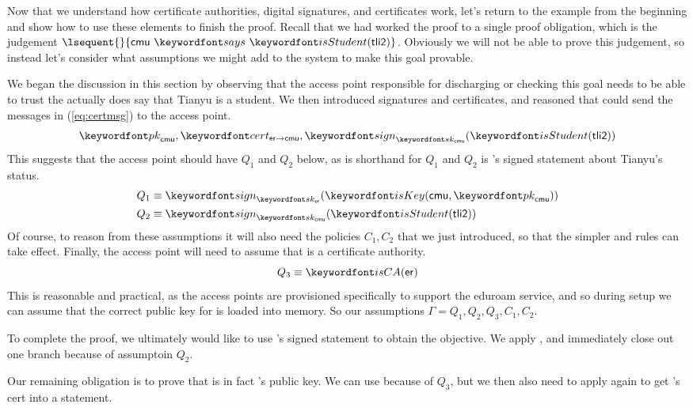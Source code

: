 \documentclass[11pt,twoside]{scrartcl}
\begin{document}
Now that we understand how certificate authorities, digital signatures, and certificates work, let's return to the example from the beginning and show how to use these elements to finish the proof. Recall that we had worked the proof to a single proof obligation, which is the judgement $\lsequent{}{\says{\cmu}{\isstu(\tli)}}$. Obviously we will not be able to prove this judgement, so instead let's consider what assumptions we might add to the system to make this goal provable.


We began the discussion in this section by observing that the access point responsible for discharging or checking this goal needs to be able to trust the \cmu actually does say that Tianyu is a student. We then introduced signatures and certificates, and reasoned that \cmu could send the messages in (\ref{eq:certmsg}) to the access point.
\[
\pk{\cmu}, \cert{\eduroam}{\cmu}, \sign{\sk{\cmu}}{\isstu(\tli)}
\]
This suggests that the access point should have $Q_1$ and $Q_2$ below, as \cert{\eduroam}{\cmu} is shorthand for $Q_1$ and $Q_2$ is \cmu's signed statement about Tianyu's status.
\begin{align}
Q_1 &\equiv \sign{\sk{\eduroam}}{\iskey{\cmu}{\pk{\cmu}}} \\
Q_2 &\equiv \sign{\sk{\cmu}}{\isstu(\tli)}
\end{align} 
Of course, to reason from these assumptions it will also need the policies $C_1,C_2$ that we just introduced, so that the simpler  and  rules can take effect. Finally, the access point will need to assume that \eduroam is a certificate authority. 
\begin{equation}
Q_3 \equiv \isca{\eduroam}
\end{equation}
This is reasonable and practical, as the access points are provisioned specifically to support the eduroam service, and so during setup we can assume that the correct public key for \eduroam is loaded into memory. So our assumptions $\Gamma = Q_1,Q_2,Q_3,C_1,C_2$.

To complete the proof, we ultimately would like to use \cmu's signed statement to obtain the objective. We apply , and immediately close out one branch because of assumptoin $Q_2$.
\begin{sequentdeduction}[array]
\linfer[sign] {
  \lsequent{\Gamma} {\iskey{\cmu}{\pk{\cmu}}}
  !\linfer[id]{\lclose}{\lsequent{\Gamma} {\sign{\sk{\cmu}}{\isstu(\tli)}}}
} {
  \lsequent{\Gamma} {\says{\cmu}{\isstu(\tli)}}
}
\end{sequentdeduction}
Our remaining obligation is to prove that \pk{\cmu} is in fact \cmu's public key. We can use  because of $Q_3$, but we then also need to apply  again to get \eduroam's cert into a statement.
\begin{sequentdeduction}[array]
\linfer[sign] {
  \linfer[id]{\lclose}{\lsequent{\Gamma}{\isca{\eduroam}}}
  !\linfer[sign] {
    \linfer[id]{\lclose}{\lsequent{\Gamma}{\iskey{\eduroam}{\pk{\eduroam}}}}
    !\linfer[id]{\lclose}{\lsequent{\Gamma}{\sign{\sk{\eduroam}}{\iskey{\cmu}{\pk{\cmu}}}}}
  } {
    \lsequent{\Gamma}{\says{\eduroam}{\iskey{\cmu}{\pk{\cmu}}}}
  }
} {
  \lsequent{\Gamma} {\iskey{\cmu}{\pk{\cmu}}}
}
\end{sequentdeduction}
\end{document}
